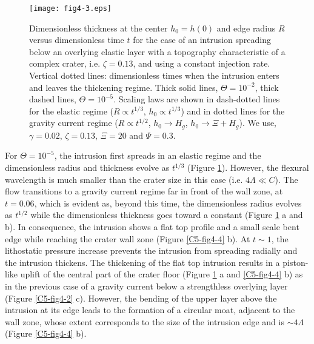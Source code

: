 \begin{figure}[htpb]
  \graphicspath{ {/Users/thorey/Documents/These/Submission/Article/FFC_JGR_2013/Paper_APRES_2nd_REVIEW/} }
  \centering
  \noindent\texttt{[image: fig4-3.eps]}
  \caption{Dimensionless thickness  at the center $h_0=h(0)$  and edge
    radius  $R$ versus  dimensionless  time  $t$ for  the  case of  an
    intrusion  spreading  below  an  overlying elastic  layer  with  a
    topography characteristic of a  complex crater, i.e. $\zeta=0.13$,
    and  using  a constant  injection  rate.   Vertical dotted  lines:
    dimensionless  times  when the  intrusion  enters  and leaves  the
    thickening  regime.  Thick  solid  lines, $\Theta=10^{-2}$,  thick
    dashed  lines,  $\Theta=10^{-5}$.   Scaling   laws  are  shown  in
    dash-dotted  lines for  the  elastic  regime ($R\propto  t^{1/3}$,
    $h_0\propto t ^{1/3}$) and in dotted lines for the gravity current
    regime    ($R\propto    t^{1/2}$,     $h_0    \rightarrow    H_g$,
    $h_0 \rightarrow \Xi+ H_g$).  We use, $\gamma=0.02$, $\zeta=0.13$,
    $\Xi=20$ and $\Psi=0.3$.}
  \label{C5-fig4-3}
\end{figure}


For $\Theta=10^{-5}$, the intrusion first spreads in an elastic regime
and the dimensionless radius and thickness evolve as $t^{1/3}$ (Figure
\ref{C5-fig4-3}).  However,  the flexural  wavelength is  much smaller
than the crater  size in this case (i.e.  $4\Lambda  \ll C$).  The flow
transitions to a gravity current regime far in front of the wall zone,
at $t=0.06$, which is evident  as, beyond this time, the dimensionless
radius  evolves as  $t^{1/2}$ while  the dimensionless  thickness goes
toward a constant  (Figure \ref{C5-fig4-3} a and  b).  In consequence,
the intrusion  shows a flat  top profile and  a small scale  bent edge
while reaching  the crater wall  zone (Figure \ref{C5-fig4-4}  b).  At
$t\sim1$,  the lithostatic  pressure increase  prevents the  intrusion
from spreading radially and the  intrusion thickens. The thickening of
the flat top intrusion results in  a piston-like uplift of the central
part of the crater floor (Figure \ref{C5-fig4-3} a and \ref{C5-fig4-4}
b) as in  the previous case of a gravity  current below a strengthless
overlying layer  (Figure \ref{C5-fig4-2}  c). However, the  bending of
the upper layer above the intrusion at its edge leads to the formation
of  a  circular  moat,  adjacent   to  the  wall  zone,  whose  extent
corresponds to the  size of the intrusion edge and  is $\sim 4\Lambda$
(Figure \ref{C5-fig4-4} b).

